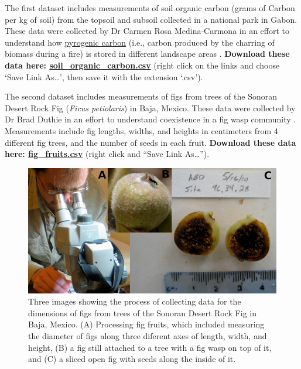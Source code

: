 \documentclass[
]{scrbook}
\begin{document}
The first dataset includes measurements of soil organic carbon (grams of Carbon per kg of soil) from the topsoil and subsoil collected in a national park in Gabon.
These data were collected by Dr Carmen Rosa Medina-Carmona in an effort to understand how \href{https://bg.copernicus.org/articles/3/397/2006/bg-3-397-2006.pdf}{pyrogenic carbon} (i.e., carbon produced by the charring of biomass during a fire) is stored in different landscape areas \citep{Santin2016, Preston2006}.
\textbf{Download these data here: \href{https://raw.githubusercontent.com/bradduthie/SCIU4T4/main/data/soil_organic_carbon.csv}{soil\_organic\_carbon.csv}} (right click on the links and choose `Save Link As\ldots{}', then save it with the extension `.csv').

The second dataset includes measurements of figs from trees of the Sonoran Desert Rock Fig (\emph{Ficus petiolaris}) in Baja, Mexico.
These data were collected by Dr Brad Duthie in an effort to understand coexistence in a fig wasp community \citep{Duthie2015b, Duthie2016}.
Measurements include fig lengths, widths, and heights in centimeters from 4 different fig trees, and the number of seeds in each fruit.
\textbf{Download these data here: \href{https://raw.githubusercontent.com/bradduthie/SCIU4T4/main/data/fig_fruits.csv}{fig\_fruits.csv}} (right click and ``Save Link As\ldots{}'').

\begin{figure}
\includegraphics[width=1\linewidth]{img/fig_data_set} \caption{Three images showing the process of collecting data for the dimensions of figs from trees of the Sonoran Desert Rock Fig in Baja, Mexico. (A) Processing fig fruits, which included measuring the diameter of figs along three diferent axes of length, width, and height, (B) a fig still attached to a tree with a fig wasp on top of it, and (C) a sliced open fig with seeds along the inside of it.}\label{fig:unnamed-chunk-23}
\end{figure}
\end{document}
